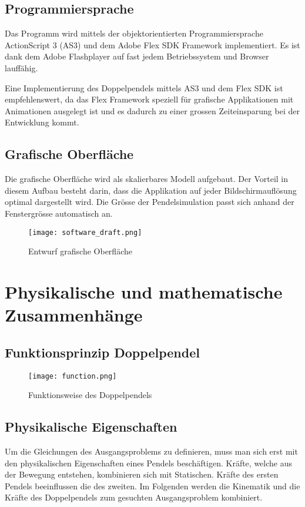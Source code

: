 \documentclass[12pt]{article}
\numberwithin{equation}{subsection}
\begin{document}
\subsection{Programmiersprache}
Das Programm wird mittels der objektorientierten Programmiersprache ActionScript 3 (AS3) und dem Adobe Flex SDK Framework \citep{flex} implementiert. Es ist dank dem Adobe Flashplayer auf fast jedem Betriebssystem und Browser lauffähig.

Eine Implementierung des Doppelpendels mittels AS3 und dem Flex SDK ist empfehlenswert, da das Flex Framework speziell für grafische Applikationen mit Animationen ausgelegt ist und es dadurch zu einer grossen Zeiteinsparung bei der Entwicklung kommt.

\subsection{Grafische Oberfläche}
Die grafische Oberfläche wird als skalierbares Modell aufgebaut. Der Vorteil in diesem Aufbau besteht darin, dass die Applikation auf jeder Bildschirmauflösung optimal dargestellt wird. Die Grösse der Pendelsimulation passt sich anhand der Fenstergrösse automatisch an.

\begin{figure}[H]
	\centering
	\texttt{[image: software\_draft.png]}
	\caption{Entwurf grafische Oberfläche}
	\label{fig:gui:draft}
\end{figure}


\newpage
\section{Physikalische und mathematische Zusammenhänge}

\subsection{Funktionsprinzip Doppelpendel}
\begin{figure}[H]
	\centering
	\texttt{[image: function.png]}
	\caption{Funktionsweise des Doppelpendels}
	\label{fig:function}
\end{figure}

\subsection{Physikalische Eigenschaften}
Um die Gleichungen des Ausgangsproblems zu definieren, muss man sich erst mit den physikalischen Eigenschaften eines Pendels beschäftigen. Kräfte, welche aus der Bewegung entstehen, kombinieren sich mit Statischen. Kräfte des ersten Pendels beeinflussen die des zweiten. Im Folgenden werden die Kinematik und die Kräfte des Doppelpendels zum gesuchten Ausgangsproblem kombiniert.
\end{document}
